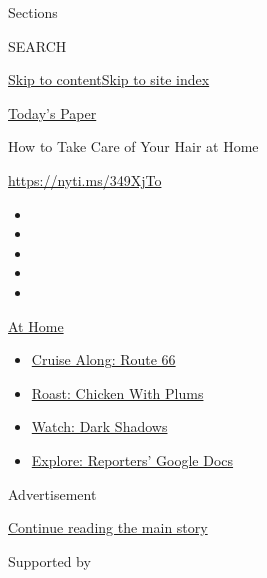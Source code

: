 Sections

SEARCH

\protect\hyperlink{site-content}{Skip to
content}\protect\hyperlink{site-index}{Skip to site index}

\href{https://myaccount.nytimes3xbfgragh.onion/auth/login?response_type=cookie\&client_id=vi}{}

\href{https://www.nytimes3xbfgragh.onion/section/todayspaper}{Today's
Paper}

How to Take Care of Your Hair at Home

\url{https://nyti.ms/349XjTo}

\begin{itemize}
\item
\item
\item
\item
\item
\end{itemize}

\href{https://www.nytimes3xbfgragh.onion/spotlight/at-home?action=click\&pgtype=Article\&state=default\&region=TOP_BANNER\&context=at_home_menu}{At
Home}

\begin{itemize}
\tightlist
\item
  \href{https://www.nytimes3xbfgragh.onion/2020/09/07/travel/route-66.html?action=click\&pgtype=Article\&state=default\&region=TOP_BANNER\&context=at_home_menu}{Cruise
  Along: Route 66}
\item
  \href{https://www.nytimes3xbfgragh.onion/2020/09/04/dining/sheet-pan-chicken.html?action=click\&pgtype=Article\&state=default\&region=TOP_BANNER\&context=at_home_menu}{Roast:
  Chicken With Plums}
\item
  \href{https://www.nytimes3xbfgragh.onion/2020/09/04/arts/television/dark-shadows-stream.html?action=click\&pgtype=Article\&state=default\&region=TOP_BANNER\&context=at_home_menu}{Watch:
  Dark Shadows}
\item
  \href{https://www.nytimes3xbfgragh.onion/interactive/2020/at-home/even-more-reporters-editors-diaries-lists-recommendations.html?action=click\&pgtype=Article\&state=default\&region=TOP_BANNER\&context=at_home_menu}{Explore:
  Reporters' Google Docs}
\end{itemize}

Advertisement

\protect\hyperlink{after-top}{Continue reading the main story}

Supported by

